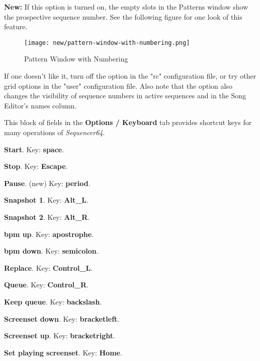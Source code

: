    \textbf{New:}
   If this option is turned on, the
   empty slots in the Patterns window show the prospective sequence number.
   See the following figure for one look of this feature.

\begin{figure}[H]
   \centering 
   \texttt{[image: new/pattern-window-with-numbering.png]}
   \caption{Pattern Window with Numbering}
   \label{fig:seq64_build_with_numbering}
\end{figure}

   If one doesn't like it, turn off the option in the "rc" configuration file,
   or try other grid options in the "user" configuration file.
   Also note that the option also changes the visibility of sequence numbers
   in active sequences and in the Song Editor's names column.

   This block of fields in the \textbf{Options / Keyboard} tab
   provides shortcut keys for many operations of
   \textsl{Sequencer64}.

   \begin{enumber}
      \item \textbf{Start}.
         Key:  \textbf{space}.
      \item \textbf{Stop}.
         Key:  \textbf{Escape}.
      \item \textbf{Pause}. (new)
         Key:  \textbf{period}.
      \item \textbf{Snapshot 1}.
         Key:  \textbf{Alt\_L}.
      \item \textbf{Snapshot 2}.
         Key:  \textbf{Alt\_R}.
      \item \textbf{bpm up}.
         Key:  \textbf{apostrophe}.
      \item \textbf{bpm down}.
         Key:  \textbf{semicolon}.
      \item \textbf{Replace}.
         Key:  \textbf{Control\_L}.
      \item \textbf{Queue}.
         Key:  \textbf{Control\_R}.
      \item \textbf{Keep queue}.
         Key:  \textbf{backslash}.
      \item \textbf{Screenset down}.
         Key: \index{keys![} \textbf{bracketleft}.
      \item \textbf{Screenset up}.
         Key: \index{keys!]} \textbf{bracketright}.
      \item \textbf{Set playing screenset}.
         Key:  \textbf{Home}.
   \end{enumber}

